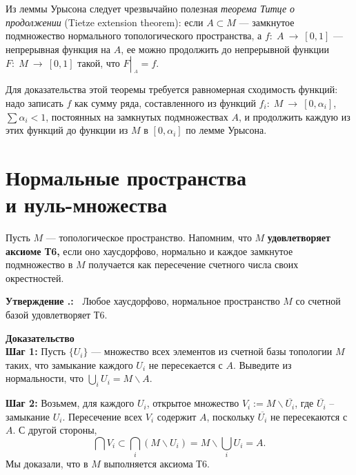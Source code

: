 \documentclass[12pt]{book}
\newcommand{\arrow}{{\:\longrightarrow\:}}
\newcommand{\restrict}[1]{{\left|_{{\phantom{|}\!\!}_{#1}}\right.}}
\def\endproof{\hbox{\vrule width 5pt height 5pt depth 0pt}}
\theoremstyle{upshape}
\theoremstyle{generic}
\def\еза{\end{remark}}
\theoremstyle{upshapenonumber}
\newtheorem{ukazanie}{Указание}[section]
\newcommand{\следствие}{%
     \refstepcounter{teorema}
     {\noindent\bf Следствие \thechapter.\arabic{teorema}:\ }}
\newcommand{\пример}{%
     \refstepcounter{teorema}
     {\noindent\bf Пример \thechapter.\arabic{teorema}:\ }}
\newcommand{\лемма}{%
     \refstepcounter{teorema}
     {\noindent\bf Лемма \thechapter.\arabic{teorema}:\ }}
\newcommand{\теорема}{%
     \refstepcounter{teorema}
     {\noindent\bf Теорема \thechapter.\arabic{teorema}:\ }}
\newcommand{\утверждение}{%
     \refstepcounter{teorema}
     {\noindent\bf Утверждение \thechapter.\arabic{teorema}:\ }}
\def\хфилл{\hfill}
\def\ноиндент{\noindent}
\def\бф{\bf}
\def\ем{\em}
\def\ит{\it}
\def\ез{\end{zadacha}}
\def\указание{\begin{ukazanie}}
\def\еу{\end{ukazanie}}
\def\ео{\end{opredelenie}}
\def\енум{\begin{enumerate}}
\def\ее{\end{enumerate}}
\def\итем{\item %
}
\begin{document}
Из леммы Урысона следует чрезвычайно
полезная {\ем теорема Титце о продолжении}
(Tietze extension theorem): если $A\subset M$ --- замкнутое
подмножество нормального топологического пространства,
а $f:\; A \arrow [0,1]$ --- непрерывная функция на $A$,
ее можно продолжить до непрерывной функции
$F:\; M \arrow [0,1]$ такой, что $F\restrict A =f$.

Для доказательства этой теоремы требуется равномерная
сходимость функций: надо записать $f$
как сумму ряда, составленного из функций 
$f_i:\;M \arrow [0, \alpha_i]$, $\sum \alpha_i < 1$,
постоянных на замкнутых подмножествах $A$,
и продолжить каждую из этих функций до функции
из $M$ в $[0, \alpha_i]$ по лемме Урысона.


\section{Нормальные пространства \\и нуль-множества}



Пусть $M$ --- топологическое пространство.
Напомним, что $M$ {\бф удовлетворяет аксиоме Т6,}
если оно хаусдорфово, нормально и каждое замкнутое подмножество
в $M$ получается как пересечение счетного числа
своих окрестностей.


\хфилл

\утверждение \label{_T_6_Utverzhdenie_}
Любое хаусдорфово, нормальное 
пространство $M$ со счетной базой 
удовлетворяет Т6.  

\хфилл

\noindent
{\бф Доказательство} \\
{\бф Шаг 1:} Пусть $\{U_i\}$ --- множество всех элементов
из счетной базы топологии $M$ таких, что
замыкание каждого $U_i$ не пересекается с $A$. Выведите
из нормальности, что $\bigcup_i U_i= M\backslash A$.

\хфилл

\ноиндент
{\бф Шаг 2:}
Возьмем, для каждого $U_i$, открытое множество
$V_i:= M \backslash \overline{U_i}$, где $\overline{U_i}$ --
замыкание $U_i$. Пересечение всех $V_i$ содержит $A$,
поскольку $\overline{U_i}$ не пересекаются с $A$.
С другой стороны, 
\[
\bigcap V_i \subset \bigcap_i (M \backslash U_i) = 
M \backslash\bigcup_i U_i = A.
\]
Мы доказали, что в $M$ выполняется аксиома Т6.
\endproof
\end{document}
